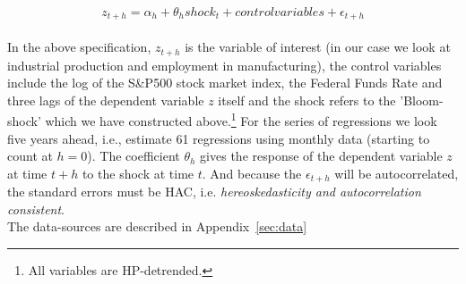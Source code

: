 \documentclass[a4paper,12pt,oneside,pointednumbers,bibtotoc,bigheadings,liststotoc]{scrbook}
\begin{document}
\begin{equation} \label{eq:2.1}
z_{t+h} = \alpha_h + \theta_h shock_t + control variables + \epsilon_{t+h}
\end{equation}\\

In the above specification, $z_{t+h}$ is the variable of interest (in our case we look at industrial production and employment in manufacturing), the control variables include the log of the S\&P500 stock market index, the Federal Funds Rate and three lags of the dependent variable $z$ itself and the shock refers to the 'Bloom-shock' which we have constructed above.\footnote{All variables are HP-detrended.} For the series of regressions we look five years ahead, i.e., estimate 61 regressions using monthly data (starting to count at $h=0$). The coefficient $\theta_h$ gives the response of the dependent variable $z$ at time $t+h$ to the shock at time $t$. And because the $\epsilon_{t+h}$ will be autocorrelated, the standard errors must be HAC, i.e. \textit{hereoskedasticity and autocorrelation consistent}.\\
The data-sources are described in Appendix~\ref{sec:data}
\end{document}
